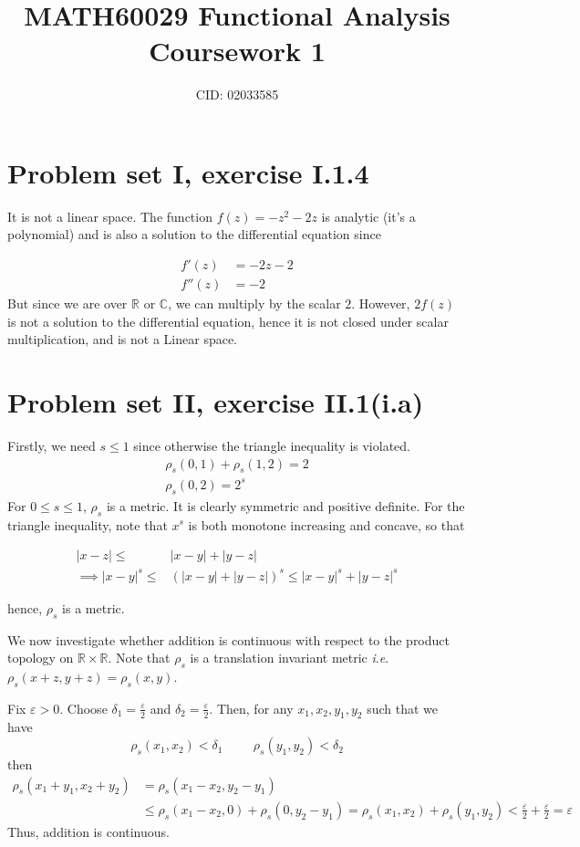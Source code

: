\documentclass{article}
\title{MATH60029 Functional Analysis Coursework 1}
\author{
CID: 02033585
}
\date{}
\numberwithin{equation}{section}
\theoremstyle{definition}
\newcommand{\R}{\mathbb{R}}
\newcommand{\C}{\mathbb{C}}
\newcommand{\ie}{\textit{i}.\textit{e}. }
\newcommand{\eps}{\varepsilon}
\begin{document}
\maketitle

\section{Problem set I, exercise I.1.4}
It is not a linear space. The function $f(z) = -z^2 - 2z$ is analytic (it's a polynomial) and is also a solution to the differential equation since

\begin{align}
    f'(z) &= -2z - 2 \\
    f''(z) &= -2
\end{align}
But since we are over $\R$ or $\C$, we can multiply by the scalar $2$. However, $2f(z)$ is not a solution to the differential equation, hence it is not closed under scalar multiplication, and is not a Linear space.

\section{Problem set II, exercise II.1(i.a)}
Firstly, we need $s \leq 1$ since otherwise the triangle inequality is violated.
\begin{align}
    \rho_s(0,1) + \rho_s(1,2) = 2 \\
    \rho_s(0,2) = 2^s
\end{align}
For $0 \leq s \leq 1$, $\rho_s$ is a metric. It is clearly symmetric and positive definite. For the triangle inequality, note that $x^s$ is both monotone increasing and concave, so that

\begin{align}
    |x-z| \leq &|x-y| + |y-z| \\
    \implies |x-y|^s \leq &(|x-y| + |y-z|)^s \leq |x-y|^s + |y-z|^s
\end{align}

hence, $\rho_s$ is a metric.

We now investigate whether addition is continuous with respect to the product topology on $\R \times \R$. Note that $\rho_s$ is a translation invariant metric \ie $\rho_s(x+z, y+z) = \rho_s(x, y)$.

Fix $\eps > 0$. Choose $\delta_1 = \frac{\eps}{2}$ and $\delta_2 = \frac{\eps}{2}$. Then, for any $x_1, x_2, y_1, y_2$ such that we have
\begin{equation}
    \rho_s(x_1,x_2) < \delta_1 \hspace{1cm}  \rho_s(y_1,y_2) < \delta_2
\end{equation}
then
\begin{align}
    \rho_s(x_1+y_1,x_2+y_2) &= \rho_s(x_1-x_2,y_2-y_1)  \\
    &\leq \rho_s(x_1-x_2,0) + \rho_s(0, y_2-y_1) = \rho_s(x_1,x_2)+ \rho_s(y_1, y_2) 
    < \frac{\eps}{2} + \frac{\eps}{2} = \eps
\end{align}
Thus, addition is continuous.
\end{document}
